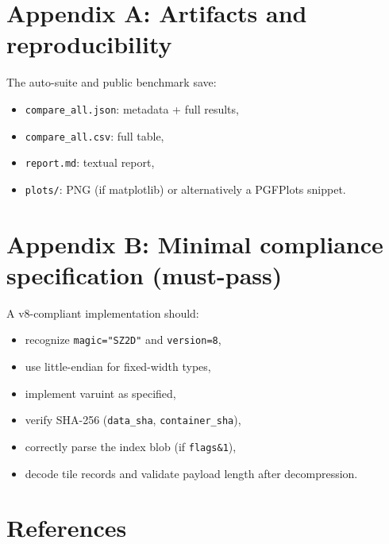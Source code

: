 \documentclass[11pt,a4paper]{article}
\begin{document}
\fi

\appendix

\section{Appendix A: Artifacts and reproducibility}
The auto-suite and public benchmark save:
\begin{itemize}
  \item \texttt{compare\_all.json}: metadata + full results,
  \item \texttt{compare\_all.csv}: full table,
  \item \texttt{report.md}: textual report,
  \item \texttt{plots/}: PNG (if matplotlib) or alternatively a PGFPlots snippet.
\end{itemize}

\section{Appendix B: Minimal compliance specification (must-pass)}
A v8-compliant implementation should:
\begin{itemize}
  \item recognize \texttt{magic="SZ2D"} and \texttt{version=8},
  \item use little-endian for fixed-width types,
  \item implement varuint as specified,
  \item verify SHA-256 (\texttt{data\_sha}, \texttt{container\_sha}),
  \item correctly parse the index blob (if \texttt{flags\&1}),
  \item decode tile records and validate payload length after decompression.
\end{itemize}

\clearpage
\section*{References}
\end{document}
